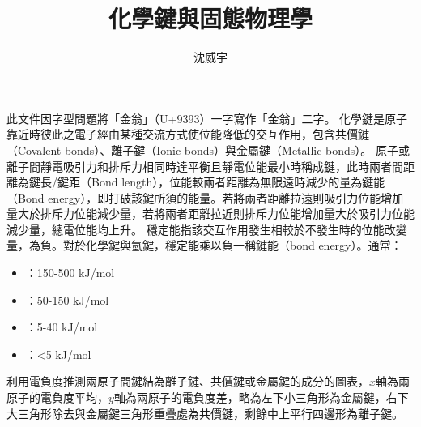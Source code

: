 \documentclass[a4paper,12pt]{report}
\begin{document}
\title{化學鍵與固態物理學}
\author{沈威宇}
\date{\temtoday}
\titletocdoc
{}
此文件因字型問題將「金翁」（U+9393）一字寫作「金翁」二字。
化學鍵是原子靠近時彼此之電子經由某種交流方式使位能降低的交互作用，包含共價鍵（Covalent bonds）、離子鍵（Ionic bonds）與金屬鍵（Metallic bonds）。
原子或離子間靜電吸引力和排斥力相同時達平衡且靜電位能最小時稱成鍵，此時兩者間距離為鍵長/鍵距（Bond length），位能較兩者距離為無限遠時減少的量為鍵能（Bond energy），即打破該鍵所須的能量。若將兩者距離拉遠則吸引力位能增加量大於排斥力位能減少量，若將兩者距離拉近則排斥力位能增加量大於吸引力位能減少量，總電位能均上升。
穩定能指該交互作用發生相較於不發生時的位能改變量，為負。對於化學鍵與氫鍵，穩定能乘以負一稱鍵能（bond energy）。通常：
\begin{itemize}
\item {}：150-500 kJ/mol
\item {}：50-150 kJ/mol
\item {}：5-40 kJ/mol
\item {}：<5 kJ/mol
\end{itemize}
利用電負度推測兩原子間鍵結為離子鍵、共價鍵或金屬鍵的成分的圖表，$x$軸為兩原子的電負度平均，$y$軸為兩原子的電負度差，略為左下小三角形為金屬鍵，右下大三角形除去與金屬鍵三角形重疊處為共價鍵，剩餘中上平行四邊形為離子鍵。
\end{document}
